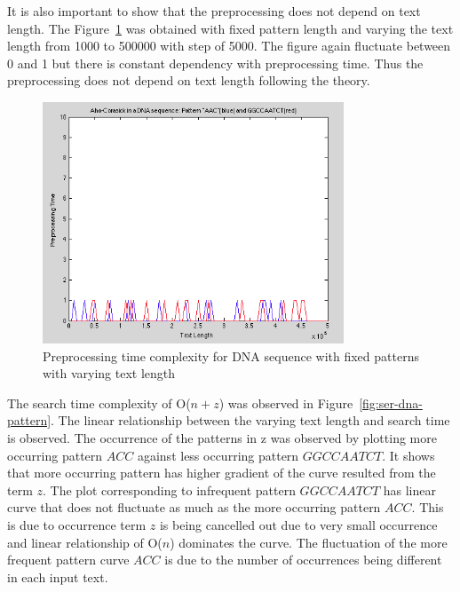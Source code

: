 \documentclass[paper=a4, fontsize=11pt]{scrartcl} %
\numberwithin{equation}{section} %
\numberwithin{figure}{section} %
\numberwithin{table}{section} %
\begin{document}
It is also important to show that the preprocessing does not depend on text length. The Figure~\ref{fig:pre-fixed-pattern} was obtained with fixed pattern length and varying the text length from 1000 to 500000 with step of 5000. The figure again fluctuate between 0 and 1 but there is constant dependency with preprocessing time. Thus the preprocessing does not depend on text length following the theory.

\begin{figure}[h!]
\centering
\includegraphics[width=0.8\textwidth]{figures/pre-DNA-fixed-pattern.png}
\caption{Preprocessing time complexity for DNA sequence with fixed patterns with varying text length}
\label{fig:pre-fixed-pattern}
\end{figure}

The search time complexity of O($n + z$) was observed in Figure~\ref{fig:ser-dna-pattern}. The linear relationship between the varying text length and search time is observed. The occurrence of the patterns in z was observed by plotting more occurring pattern $ACC$ against less occurring pattern $GGCCAATCT$. It shows that more occurring pattern has higher gradient of the curve resulted from the term $z$. The plot corresponding to infrequent pattern $GGCCAATCT$ has linear curve that does not fluctuate as much as the more occurring pattern $ACC$. This is due to occurrence term $z$ is being cancelled out due to very small occurrence and linear relationship of O($n$) dominates the curve. The fluctuation of the more frequent pattern curve $ACC$ is due to the number of occurrences being different in each input text.
\end{document}
